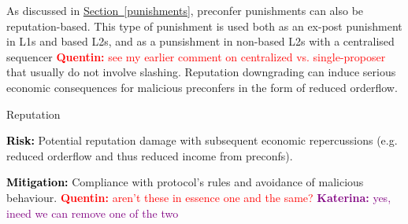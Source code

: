 \documentclass[a4paper]{article}
\theoremstyle{boldstyle}
\newlength{\entrysep}
\newcommand{\risk}[1]{\par\noindent\textbf{\textcolor{black}{Risk:}} #1\par\vspace{\entrysep}}
\newcommand{\mitigation}[1]{\par\noindent\textbf{\textcolor{black}{Mitigation:}} #1}
\newcommand{\qb}[1]{\textcolor{red}{\textbf{Quentin:} #1}}
\newcommand{\ks}[1]{\textcolor{purple}{\textbf{Katerina:} #1}}
\begin{document}
        As discussed in \hyperref[punishments]{Section~\ref{punishments}}, preconfer punishments can also be reputation-based. This type of punishment is used both as an ex-post punishment in L1s and based L2s, and as a punsishment in non-based L2s with a centralised sequencer \qb{see my earlier comment on centralized vs. single-proposer} that usually do not involve slashing. Reputation downgrading can induce serious economic consequences for malicious preconfers in the form of reduced orderflow. 
            \begin{riskbox}{Reputation}
                \risk{Potential reputation damage with subsequent economic repercussions (e.g.  reduced orderflow and thus reduced income from preconfs).}
                \mitigation{Compliance with protocol's rules and avoidance of malicious behaviour. \qb{aren't these in essence one and the same?}} \ks{yes, ineed we can remove one of the two}
            \end{riskbox}
        
\end{document}
